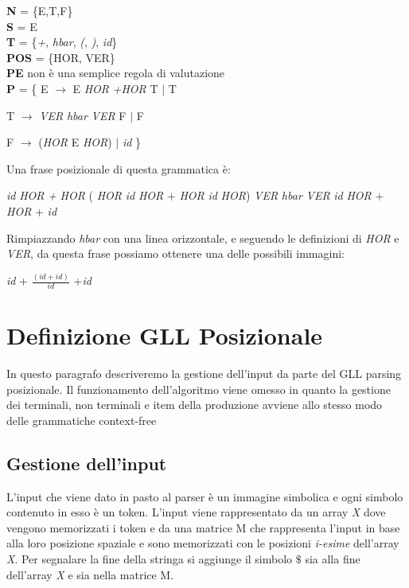 \begin{center}
	\textbf{N} = \{E,T,F\} \\
	\textbf{S} = E  \\
	\textbf{T} =  \{\textit{+}, \textit{hbar}, \textit{(}, \textit{)}, \textit{id}\} \\
	\textbf{POS}  = \{HOR, VER\}\\
	\textbf{PE} non è una semplice regola di valutazione\\
	\textbf{P}   = \{ E $\to$ E \textit{HOR} \textit{+}\textit{HOR} T $\mid$ T \par 
	         \hspace{1.1cm}T $\to$ \textit{VER} \textit{hbar} \textit{VER} F $\mid$ F \par 
	         \hspace{1.1cm} F $\to$ (\textit{HOR} E \textit{HOR}) $\mid$ \textit{id}  \}   
\end{center}
Una frase posizionale di questa grammatica è:
\begin{center}
	\textit{id} \textit{HOR} \textit{+} \textit{HOR} ( \textit{HOR} \textit{id} \textit{HOR} + \textit{HOR} \textit{id} \textit{HOR}) \textit{VER} \textit{hbar} \textit{VER} \textit{id} \textit{HOR} + \textit{HOR} + \textit{id}
\end{center}
Rimpiazzando \textit{hbar} con una linea orizzontale, e seguendo le definizioni di \textit{HOR} e \textit{VER}, da questa frase possiamo ottenere una delle possibili immagini:
\begin{center}
	 \textit{id} + $\frac{(\textit{id} + \textit{id})}{\textit{id}}$ +\textit{id}
\end{center}
\section{Definizione GLL Posizionale}
In questo paragrafo descriveremo la gestione dell'input da parte del GLL parsing posizionale. Il funzionamento dell'algoritmo viene omesso in quanto la gestione dei terminali, non terminali e item della produzione avviene allo stesso modo delle grammatiche context-free
\subsection{Gestione dell'input}
L'input che viene dato in pasto al parser è un immagine simbolica e ogni simbolo contenuto in esso è un token. L'input viene rappresentato da un array \textit{X} dove vengono memorizzati i token e da una matrice M che rappresenta l'input in base alla loro posizione spaziale e sono memorizzati con le posizioni \textit{i-esime} dell'array \textit{X}. Per segnalare la fine della stringa si aggiunge il simbolo $\$$ sia alla fine dell'array \textit{X} e sia nella matrice M.
